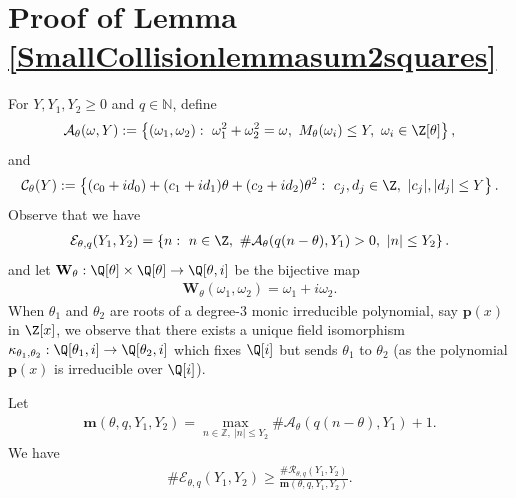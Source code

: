 \documentclass[12pt]{amsart}
\newcommand{\1}{\mathmybb{1}}
\begin{document}
\section{Proof of Lemma \ref{SmallCollisionlemmasum2squares}}
For $Y,Y_{1},Y_{2} \geq 0$ and $q \in \mathbb{N}$, define
\begin{align*}
\mathcal{A}_{\theta}(\omega,Y) := \left\{(\omega_{1},\omega_{2}): \ \omega_{1}^2+\omega_{2}^2 = \omega, \ M_{\theta}(\omega_{i}) \leq Y, \ \omega_{i} \in \Z[\theta]\right\},
\end{align*}
and
\begin{align*}
\mathcal{C}_{\theta}(Y) := \left\{(c_{0}+id_{0}) + (c_{1}+id_{1})\theta +(c_{2}+id_{2})\theta^2: \ c_{j},d_{j}\in \Z, \ |c_{j}|,|d_{j}| \leq Y\right\}.
\end{align*}
Observe that we have
\begin{align}
\label{Ethetaqsetequation}
\mathcal{E}_{\theta,q}(Y_{1},Y_{2}) = \left\{n: \ n\in \Z, \  \#\mathcal{A}_{\theta}(q(n-\theta),Y_{1}) > 0, \ |n| \leq Y_{2}\right\}.
\end{align}
and let $\mathbf{W}_{\theta}: \Q[\theta]\times \Q[\theta] \rightarrow \Q[\theta,i]$ be the bijective map
\begin{align*}
\mathbf{W}_{\theta}(\omega_{1},\omega_{2}) = \omega_{1} + i\omega_{2}.
\end{align*}
When $\theta_{1}$ and $\theta_{2}$ are roots of a degree-$3$ monic irreducible polynomial, say $\mathbf{p}(x)$ in $\Z[x]$, we observe that there exists a unique field isomorphism $\kappa_{\theta_{1},\theta_{2}} : \Q[\theta_{1},i] \rightarrow \Q[\theta_{2},i]$ which fixes $\Q[i]$ but sends $\theta_{1}$ to $\theta_{2}$ (as the polynomial $\mathbf{p}(x)$ is irreducible over $\Q[i]$).
\begin{lem}
\label{Ethethaqlowerbound1}
Let 
\begin{align*}
\mathbf{m}(\theta,q,Y_{1},Y_{2}) = \max\limits_{n \in \mathbb{Z}, \ \lvert n \rvert \leq Y_2}\# \mathcal{A}_{\theta}(q(n-\theta),Y_{1}) + 1.
\end{align*}
We have
\begin{align*}
\#\mathcal{E}_{\theta,q}(Y_{1},Y_{2}) \geq \frac{\#\mathcal{R}_{\theta,q}(Y_{1},Y_{2})}{\mathbf{m}(\theta,q,Y_{1},Y_{2})}.
\end{align*}
\end{lem}
\end{document}

